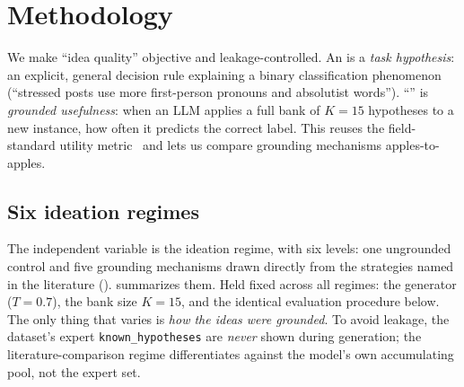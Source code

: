 \section{Methodology}
\label{sec:method}

 We make ``idea quality'' objective and
leakage-controlled. An  is a \emph{task hypothesis}: an explicit,
general decision rule explaining a binary classification phenomenon (\eg ``stressed
posts use more first-person pronouns and absolutist words''). ``''
is \emph{grounded usefulness}: when an LLM applies a full bank of $K=15$ hypotheses
to a new instance, how often it predicts the correct label. This reuses the
field-standard \hypogenic{} utility metric~\citep{zhou2024hypogenic} and lets us
compare grounding mechanisms apples-to-apples.

\subsection{Six ideation regimes}
\label{sec:regimes}

The independent variable is the ideation regime, with six levels: one ungrounded
control and five grounding mechanisms drawn directly from the strategies named in the
literature ().  summarizes them. Held fixed
across all regimes: the generator \gptmini{} ($T{=}0.7$), the bank size $K{=}15$, and
the identical evaluation procedure below. The only thing that varies is \emph{how the
ideas were grounded}. To avoid leakage, the dataset's expert \texttt{known\_hypotheses}
are \emph{never} shown during generation; the literature-comparison regime
differentiates against the model's own accumulating pool, not the expert set.

